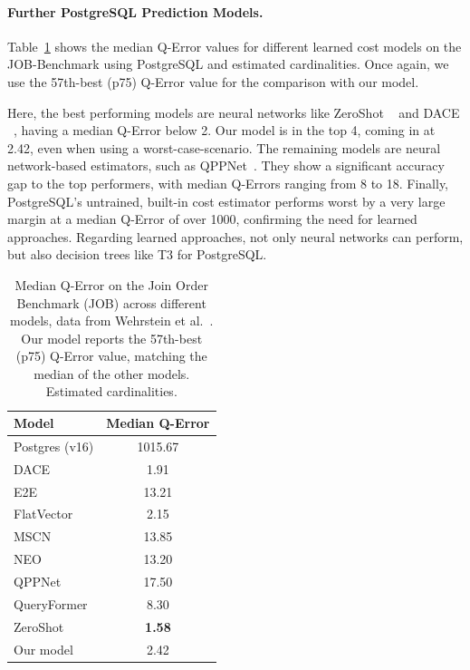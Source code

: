 \paragraph{Further PostgreSQL Prediction Models.}

Table~\ref{tab:median_qerror_job} shows the median Q-Error values for different learned cost models on the JOB-Benchmark using PostgreSQL and estimated cardinalities.
Once again, we use the 57th-best (p75) Q-Error value for the comparison with our model.

Here, the best performing models are neural networks like ZeroShot ~\parencite{zeroshot} and DACE ~\parencite{dace}, having a median Q-Error below 2.
Our model is in the top 4, coming in at 2.42, even when using a worst-case-scenario.
The remaining models are neural network-based estimators, such as QPPNet~\parencite{qppnet}.
They show a significant accuracy gap to the top performers, with median Q-Errors ranging from 8 to 18.
Finally, PostgreSQL's untrained, built-in cost estimator performs worst by a very large margin at a median Q-Error of over 1000, confirming the need for learned approaches.
Regarding learned approaches, not only neural networks can perform, but also decision trees like T3 for PostgreSQL.


\begin{table}[htpb]
  \centering
  \begin{tabular}{lc}
    \toprule
    \textbf{Model} & \textbf{Median Q-Error} \\
    \midrule
    Postgres (v16)  & 1015.67 \\
    DACE            & 1.91    \\
    E2E             & 13.21   \\
    FlatVector      & 2.15    \\
    MSCN            & 13.85   \\
    NEO             & 13.20   \\
    QPPNet          & 17.50   \\
    QueryFormer     & 8.30    \\
    ZeroShot        & \textbf{1.58}    \\
    Our model & 2.42 \\
    \bottomrule
  \end{tabular}
  \caption[Median Q-Error on JOB]{Median Q-Error on the Join Order Benchmark (JOB) across different models, data from Wehrstein et al.~\parencite{jobcomplex}. Our model reports the 57th-best (p75) Q-Error value, matching the median of the other models. Estimated cardinalities. }\label{tab:median_qerror_job}
\end{table}

